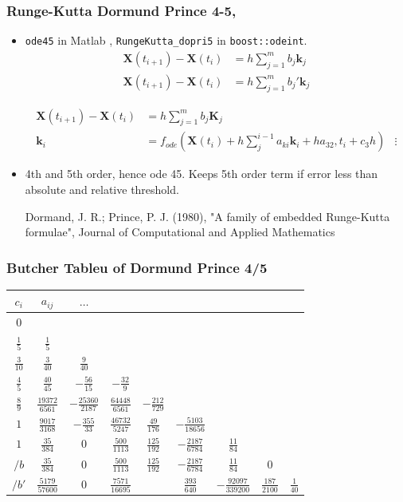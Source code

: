 \documentclass{beamer}
\begin{document}
\begin{frame}
\frametitle{Runge-Kutta Dormund Prince 4-5, }

\begin{itemize}


\item <1->\lstinline{ode45} in Matlab , \lstinline{RungeKutta_dopri5} in \lstinline{boost::odeint}.
\begin{align*}
\mathbf{X}(t_{i+1})-\mathbf{X}(t_{i}) &=  h \sum_{j=1}^{m} b_j \mathbf{k}_j\\
\mathbf{X}(t_{i+1})-\mathbf{X}(t_{i}) &=  h \sum_{j=1}^{m} b_j' \mathbf{k}_j
\end{align*}

\begin{align*}
\mathbf{X}(t_{i+1})-\mathbf{X}(t_{i}) &=  h \sum_{j=1}^{m} b_j \mathbf{K}_j\\
\mathbf{k}_i &= f_{ode}(\mathbf{X}(t_i)+h \sum_j^{i-1} a_{ki} \mathbf{k}_i+ha_{32},t_i+c_3 h)
&\vdots
\end{align*}

\item<2-> 4th and 5th order, hence ode 45. Keeps 5th order term if error less than absolute and relative threshold.

{\color{gray} Dormand, J. R.; Prince, P. J. (1980), "A family of embedded Runge-Kutta formulae", Journal of Computational and Applied Mathematics}
\end{itemize}
\end{frame}


\begin{frame}
\frametitle{Butcher Tableu of Dormund Prince 4/5}
\begin{tabular}{c | @{\quad} c @{\quad} c @{\quad} c @{\quad} c @{\quad} c @{\quad} c @{\quad} c @{\quad} c}
$c_i$ & $a_{ij}$ & $\hdots$\\
\midrule
$0$ \\
$\frac{1}{5}$ & $\frac{1}{5}$\\
$\frac{3}{10}$ & $\frac{3}{40}$ &  $\frac{9}{40}$\\
$\frac{4}{5}$ & $\frac{40}{45}$ &  $-\frac{56}{15}$  &  $-\frac{32}{9}$\\
$\frac{8}{9}$ & $\frac{19372}{6561}$ & $−\frac{25360}{2187}$ & $\frac{64448}{6561}$ & $−\frac{212}{729}$\\
$1$ & $\frac{9017}{3168}$ & $-\frac{355}{33}$ & $\frac{46732}{5247}$ & $\frac{49}{176}$  & $-\frac{5103}{18656}$\\
$1$ & $\frac{35}{384}$  & $0$	 & $\frac{500}{1113}$ & $\frac{125}{192}$ & $-\frac{2187}{6784}$ & $\frac{11}{84}$\\
\midrule
$/b$  & $\frac{35}{384}$ & $0$ & $\frac{500}{1113}$ & $\frac{125}{192}$ & $-\frac{2187}{6784}$ & $\frac{11}{84}$ & $0$\\
$/b'$ & $\frac{5179}{57600}$ & $0$ & $\frac{7571}{16695}$ & & $\frac{393}{640}$ & $-\frac{92097}{339200}$& $\frac{187}{2100}$ & $\frac{1}{40}$\\
\end{tabular}
\end{frame}
\end{document}
